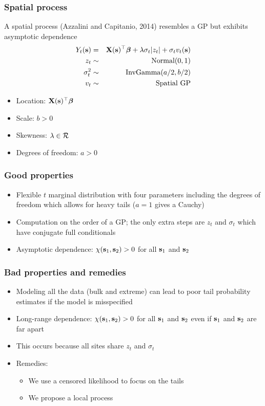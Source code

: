 \documentclass{beamer}
\begin{document}
\begin{frame}\frametitle{Spatial \skewt{} process}
A spatial \skewt{} process (Azzalini and Capitanio, 2014)  resembles a GP but exhibits asymptotic dependence
	\begin{eqnarray}
	 	Y_t(\mathbf{s}) &=& \mathbf{X}(\mathbf{s})^\top\mbox{\boldmath $\beta$} +\lambda\sigma_t|z_t| + \sigma_tv_t(\mathbf{s})\nonumber\\
	 	z_t &\sim& \mbox{Normal}(0,1)\nonumber\\
	 	\sigma_t^2&\sim& \mbox{InvGamma}(a/2,b/2)\nonumber\\
	 	v_t&\sim& \mbox{Spatial GP}\nonumber
 	\end{eqnarray}
 	\begin{itemize}\setlength\itemsep{\fill}
	 	\item Location: $\mathbf{X}(\mathbf{s})^\top\mbox{\boldmath $\beta$}$
	 	\item Scale: $b>0$
	 	\item Skewness: $\lambda\in{\cal R}$
	 	\item Degrees of freedom: $a>0$
	\end{itemize}
\end{frame}



 \begin{frame}\frametitle{Good properties}
 	\begin{itemize}\setlength\itemsep{\fill}
 	\item Flexible $t$ marginal distribution with four parameters including the degrees of freedom which allows for heavy tails ($a=1$ gives a Cauchy)
 	\item Computation on the order of a GP; the only extra steps are $z_t$ and $\sigma_t$ which have conjugate full conditionals
 	\item Asymptotic dependence: $\chi(\mathbf{s}_1,\mathbf{s}_2)>0$ for all $\mathbf{s}_1$ and $\mathbf{s}_2$
 	\end{itemize}
 \end{frame}

 \begin{frame}\frametitle{Bad properties and remedies}
 	\begin{itemize}\setlength\itemsep{1em}
 	\item Modeling all the data (bulk and extreme) can lead to poor tail probability estimates if the model is misspecified
 	\item Long-range dependence: $\chi(\mathbf{s}_1,\mathbf{s}_2)>0$ for all $\mathbf{s}_1$ and $\mathbf{s}_2$ even if $\mathbf{s}_1$ and $\mathbf{s}_2$ are far apart
 	\item This occurs because all sites share $z_t$ and $\sigma_t$
 	\item Remedies:
 	\begin{itemize}
 	\item We use a censored likelihood to focus on the tails
 	\item We propose a local \skewt{} process
 	\end{itemize}
 	\end{itemize}
 \end{frame}
\end{document}
